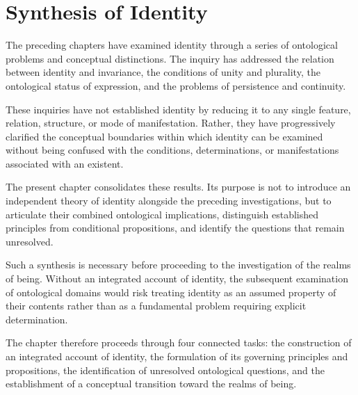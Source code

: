 
\chapter{Synthesis of Identity}
\label{ch:synthesis-of-identity}


\newcommand{\ChapterSixTitle}{Synthesis of Identity}
\newcommand{\ChapterSixID}{VS.B01.P01.C06}


The preceding chapters have examined identity through a series
of ontological problems and conceptual distinctions. The inquiry
has addressed the relation between identity and invariance, the
conditions of unity and plurality, the ontological status of
expression, and the problems of persistence and continuity.

These inquiries have not established identity by reducing it to
any single feature, relation, structure, or mode of manifestation.
Rather, they have progressively clarified the conceptual
boundaries within which identity can be examined without being
confused with the conditions, determinations, or manifestations
associated with an existent.

The present chapter consolidates these results. Its purpose is
not to introduce an independent theory of identity alongside
the preceding investigations, but to articulate their combined
ontological implications, distinguish established principles
from conditional propositions, and identify the questions that
remain unresolved.

Such a synthesis is necessary before proceeding to the
investigation of the realms of being. Without an integrated
account of identity, the subsequent examination of ontological
domains would risk treating identity as an assumed property of
their contents rather than as a fundamental problem requiring
explicit determination.

The chapter therefore proceeds through four connected tasks:
the construction of an integrated account of identity, the
formulation of its governing principles and propositions, the
identification of unresolved ontological questions, and the
establishment of a conceptual transition toward the realms of
being.

